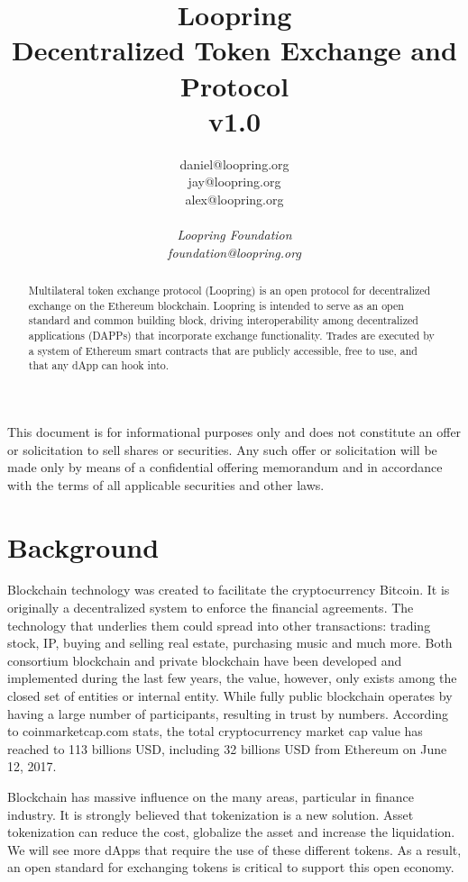 \documentclass[UTF8,nofonts]{article}
\title{\textbf{Loopring}\\\textbf{Decentralized Token Exchange and Protocol}\\v1.0}
\author{
  daniel@loopring.org\\
  jay@loopring.org\\
  alex@loopring.org\\ 
  \\
  \textit{Loopring Foundation}\\
  \textit{foundation@loopring.org}\\
 }
\begin{document}
\maketitle
This document is for informational purposes only and does not constitute an offer or solicitation to sell shares or securities. Any such offer or solicitation will be made only by means of a confidential offering memorandum and in accordance with the terms of all applicable securities and other laws.



\begin{abstract}
Multilateral token exchange protocol (Loopring) is an open protocol for decentralized exchange on the Ethereum blockchain. Loopring is intended to serve as an open standard and common building block,  driving interoperability among decentralized applications (DAPPs) that incorporate exchange functionality. Trades are executed by a system of Ethereum smart contracts that are publicly accessible,  free to use, and that any dApp can hook into.
\end{abstract}

\newpage

\tableofcontents
\newpage

\section{Background\label{sec: background}}

Blockchain\cite{staff2016blockchains}\cite{swan2015blockchain} technology was created to facilitate the cryptocurrency Bitcoin\cite{nakamoto2008Bitcoin}. It is originally a decentralized system to enforce the financial agreements\cite{lamport1982byzantine}\cite{christidis2016blockchains}. The technology that underlies them could spread into other transactions: trading stock,  IP, buying and selling real estate, purchasing music and much more. Both consortium blockchain and private blockchain have been developed and implemented during the last few years, the value, however, only exists among the closed set of entities or internal entity. While fully public blockchain operates by having a large number of participants,  resulting in trust by numbers. According to coinmarketcap.com stats,  the total cryptocurrency market cap value has reached to 113 billions USD,  including 32 billions USD from Ethereum\cite{wood2014ethereum} on June 12, 2017.

Blockchain has massive influence on the many areas,  particular in finance industry. It is strongly believed that tokenization\cite{liu2016medical}\cite{christidis2016blockchains}\cite{swan2015blockchain} is a new solution. Asset tokenization can reduce the cost,  globalize the asset and increase the liquidation. We will see more dApps that require the use of these different tokens. As a result,  an open standard for exchanging tokens is critical to support this open economy.
\end{document}

